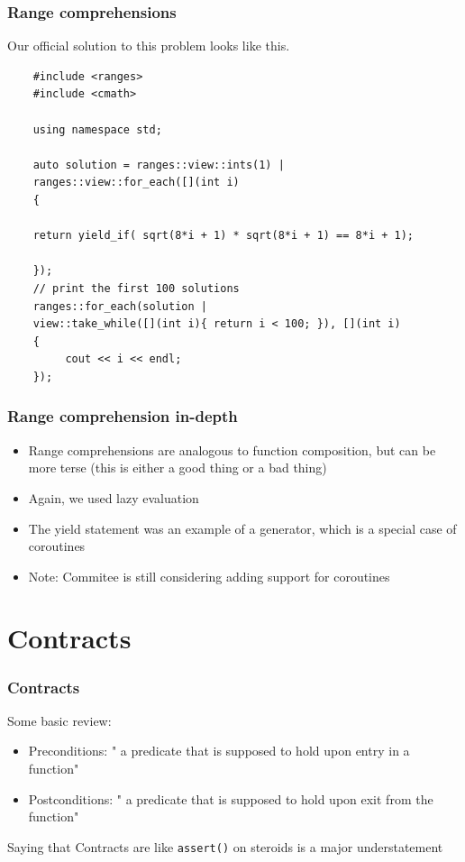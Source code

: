 \documentclass{beamer}
\begin{document}
\begin{frame}[fragile]
\frametitle{Range comprehensions}
Our official solution to this problem looks like this.

\begin{lstlisting}
    #include <ranges>
    #include <cmath>
    
    using namespace std;    
    
    auto solution = ranges::view::ints(1) | 
    ranges::view::for_each([](int i)
    {
    
    return yield_if( sqrt(8*i + 1) * sqrt(8*i + 1) == 8*i + 1); 
    
    });
    // print the first 100 solutions
    ranges::for_each(solution | 
    view::take_while([](int i){ return i < 100; }), [](int i)
    {
         cout << i << endl;
    });
\end{lstlisting}
\end{frame}

\begin{frame}
\frametitle{Range comprehension in-depth}
\begin{itemize}
\setlength\itemsep{2em}
\item Range comprehensions are analogous to function composition, but can be more terse (this is either a good thing or a bad thing)
\item Again, we used lazy evaluation
\item The yield statement was an example of a generator, which is a special case of coroutines

\item Note: Commitee is still considering adding support for coroutines
\end{itemize}
\end{frame}

\section{Contracts}
\begin{frame}
\frametitle{Contracts}
Some basic review:
\begin{itemize}
\item Preconditions: " a predicate that is supposed to hold upon entry in a function"
\item Postconditions: " a predicate that is supposed to hold upon exit from the function"
\end{itemize}

\vspace{2em}
Saying that Contracts are like \texttt{assert()} on steroids is a major understatement
\end{frame}
\end{document}

